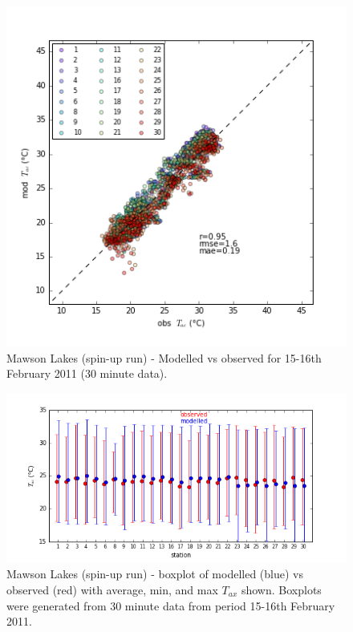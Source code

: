 \documentclass[final,3p,times,authoryear]{elsarticle}
\begin{document}
\begin{figure}[!htbp]
\includegraphics[trim=0mm 0mm 0mm 0mm, clip,scale=1.0]{images/MawsonModObs.png}
 \caption{Mawson Lakes (spin-up  run) - Modelled  vs observed  for 15-16th February 2011 (30 minute data).} \label{fig:MawsonModObs}
\end{figure}

\begin{figure}[!htbp]
\includegraphics[trim=0mm 0mm 0mm 0mm, clip,scale=0.8]{images/MawsonBox.png}
 \caption{Mawson Lakes (spin-up  run) - boxplot of modelled  (blue) vs observed  (red) with average, min, and max $T_{ax}$ shown. Boxplots were generated from 30 minute data from period 15-16th February 2011.} \label{fig:MawsonBox}
\end{figure}
\end{document}
